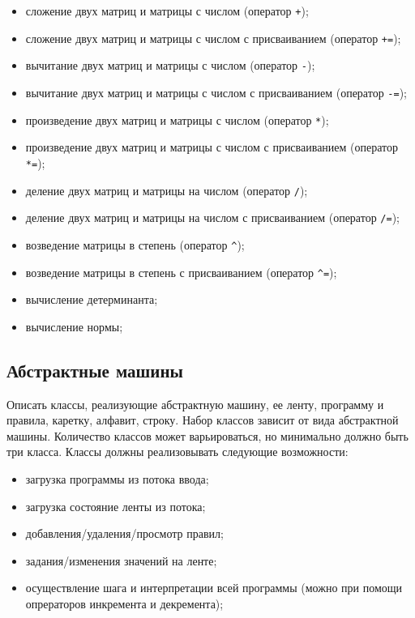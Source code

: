 \documentclass[a4paper,12pt]{article}
\begin{document}
\begin{itemize}
\item сложение двух матриц и матрицы с числом (оператор
  \lstinline|+|);
\item сложение двух матриц и матрицы с числом с присваиванием
  (оператор \lstinline|+=|);
\item вычитание двух матриц и матрицы с числом (оператор
  \lstinline|-|);
\item вычитание двух матриц и матрицы с числом с присваиванием
  (оператор \lstinline|-=|);
\item произведение двух матриц и матрицы с числом (оператор
  \lstinline|*|);
\item произведение двух матриц и матрицы с числом с присваиванием
  (оператор \lstinline|*=|);
\item деление двух матриц и матрицы на числом (оператор
  \lstinline|/|);
\item деление двух матриц и матрицы на числом с присваиванием
  (оператор \lstinline|/=|);
\item возведение матрицы в степень (оператор \lstinline|^|);
\item возведение матрицы в степень с присваиванием (оператор
  \lstinline|^=|);
\item вычисление детерминанта;
\item вычисление нормы;
\end{itemize}

\subsection{Абстрактные машины}

Описать классы, реализующие абстрактную машину, ее ленту, программу и
правила, каретку, алфавит, строку. Набор классов зависит от вида
абстрактной машины. Количество классов может варьироваться, но
минимально должно быть три класса.  Классы должны реализовывать
следующие возможности:

\begin{itemize}
\item загрузка программы из потока ввода;
\item загрузка состояние ленты из потока;
\item добавления/удаления/просмотр правил;
\item задания/изменения значений на ленте;
\item осуществление шага и интерпретации всей программы (можно при
  помощи опрераторов инкремента и декремента);
\end{itemize}
\end{document}
